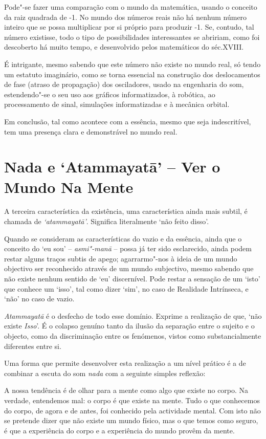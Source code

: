 Pode"-se fazer uma comparação com o mundo da matemática, usando o
conceito da raiz quadrada de -1. No mundo dos números reais não há
nenhum número inteiro que se possa multiplicar por si próprio para
produzir -1. Se, contudo, tal número existisse, todo o tipo de
possibilidades interessantes se abririam, como foi descoberto há muito
tempo, e desenvolvido pelos matemáticos do séc.XVIII.

É intrigante, mesmo sabendo que este número não existe no mundo real, só
tendo um estatuto imaginário, como se torna essencial na construção dos
deslocamentos de fase (atraso de propagação) dos osciladores, usado na
engenharia do som, estendendo"-se o seu uso aos gráficos informatizados,
à robótica, ao processamento de sinal, simulações informatizadas e à
mecânica orbital.

Em conclusão, tal como acontece com a essência, mesmo que seja
indescritível, tem uma presença clara e demonstrável no mundo real.\cite{imaginary}

\section{Nada e `Atammayatā' -- Ver o Mundo Na Mente}

A terceira característica da existência, uma característica ainda mais
subtil, é chamada de \emph{`atammayatā'}. Significa literalmente `não
feito disso'.

Quando se consideram as características do vazio e da essência, ainda
que o conceito do `eu sou' -- \emph{asmi"-manā} -- possa já ter sido
esclarecido, ainda podem restar alguns traços subtis de apego;
agarrarmo"-nos à ideia de um mundo objectivo ser reconhecido através de
um mundo subjectivo, mesmo sabendo que não existe nenhum sentido de `eu'
discernível. Pode restar a sensação de um `isto' que conhece um `isso',
tal como dizer `sim', no caso de Realidade Intrínseca, e `não' no caso
de vazio.

\emph{Atammayatā} é o desfecho de todo esse domínio. Exprime a
realização de que, `não existe \emph{Isso}'. É o colapso genuíno tanto
da ilusão da separação entre o sujeito e o objecto, como da
discriminação entre os fenómenos, vistos como substancialmente
diferentes entre si.

Uma forma que permite desenvolver esta realização a um nível prático é a
de combinar a escuta do som \emph{nada} com a seguinte simples reflexão:

A nossa tendência é de olhar para a mente como algo que existe no corpo.
Na verdade, entendemos mal: o corpo é que existe na mente. Tudo o que
conhecemos do corpo, de agora e de antes, foi conhecido pela actividade
mental. Com isto não se pretende dizer que não existe um mundo físico,
mas o que temos como seguro, é que a experiência do corpo e a
experiência do mundo provêm da mente.

